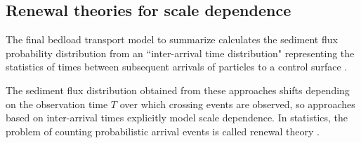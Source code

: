 \subsection{Renewal theories for scale dependence}
\label{sec:renewal}
The final bedload transport model to summarize calculates the sediment flux probability distribution from an ``inter-arrival time distribution" representing the statistics of times between subsequent arrivals of particles to a control surface \citep{Turowski2010, Heyman2013,Ancey2020}.

The sediment flux distribution obtained from these approaches shifts depending on the observation time $T$ over which crossing events are observed, so approaches based on inter-arrival times explicitly model scale dependence.
In statistics, the problem of counting probabilistic arrival events is called renewal theory \citep{Cox1962}.

